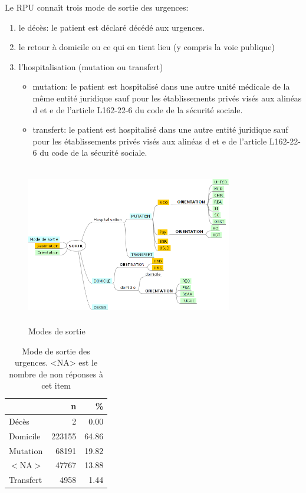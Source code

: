 \documentclass[12pt,english,french,twoside]{book}\usepackage[]{graphicx}\usepackage[]{color}
\begin{document}
Le RPU connaît trois mode de sortie des urgences:
\begin{enumerate}
  \item le décès: le patient est déclaré décédé aux urgences.
  \item le retour à domicile ou ce qui en tient lieu (y compris la voie publique)
  \item l'hospitalisation (mutation ou transfert)
  \begin{itemize}
  \item mutation: le patient est hospitalisé dans une autre unité médicale de la même entité juridique sauf pour les établissements privés visés aux alinéas d et e de l'article L162-22-6 du code de la sécurité sociale.
  \item transfert: le patient est hospitalisé dans une autre  entité juridique sauf pour les établissements privés visés aux alinéas d et e de l'article L162-22-6 du code de la sécurité sociale.
\end{itemize}
\end{enumerate}

 \begin{figure}[h]
 \centering
 \includegraphics[width=9cm,height=7cm,bb=0 0 669 437]{figure/Mode de SORTIE.png}
 \caption{Modes de sortie}
\end{figure}

\begin{table}[ht]
\centering
\begin{tabular}{|l|r|r|}
  \hline
 & n & \% \\ 
  \hline
Décès & 2 & 0.00 \\ 
  Domicile & 223155 & 64.86 \\ 
  Mutation & 68191 & 19.82 \\ 
  $<$NA$>$ & 47767 & 13.88 \\ 
  Transfert & 4958 & 1.44 \\ 
   \hline
\end{tabular}
\caption[Mode de sortie des urgences]{Mode de sortie des urgences. <NA> est le nombre de non réponses à cet item} 
\label{tab.sortie}
\end{table}
\end{document}
